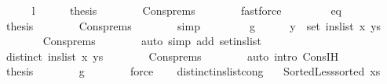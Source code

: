 \begin{isabellebody}
\ \ \ \ \isamarkupfalse%
\ l\isanewline
\ \ \ \ \isamarkupfalse%
\ {\isacharquery}{\kern0pt}thesis\isanewline
\ \ \ \ \ \ \isamarkupfalse%
\ Cons{\isachardot}{\kern0pt}prems\isanewline
\ \ \ \ \ \ \isamarkupfalse%
\ fastforce\isanewline
\ \ \isamarkupfalse%
\isanewline
\ \ \ \ \isamarkupfalse%
\ eq\isanewline
\ \ \ \ \isamarkupfalse%
\ {\isacharquery}{\kern0pt}thesis\isanewline
\ \ \ \ \ \ \isamarkupfalse%
\ Cons{\isachardot}{\kern0pt}prems\isanewline
\ \ \ \ \ \ \isamarkupfalse%
\ simp\isanewline
\ \ \isamarkupfalse%
\isanewline
\ \ \ \ \isamarkupfalse%
\ g\isanewline
\ \ \ \ \isamarkupfalse%
\ {\isachardoublequoteopen}y\ {\isasymnotin}\ set\ {\isacharparenleft}{\kern0pt}ins{\isacharunderscore}{\kern0pt}list\ x\ ys{\isacharparenright}{\kern0pt}{\isachardoublequoteclose}\isanewline
\ \ \ \ \ \ \isamarkupfalse%
\ Cons{\isachardot}{\kern0pt}prems\isanewline
\ \ \ \ \ \ \isamarkupfalse%
\ {\isacharparenleft}{\kern0pt}auto\ simp\ add{\isacharcolon}{\kern0pt}\ set{\isacharunderscore}{\kern0pt}ins{\isacharunderscore}{\kern0pt}list{\isacharparenright}{\kern0pt}\isanewline
\ \ \ \ \isamarkupfalse%
\ \isamarkupfalse%
\ {\isachardoublequoteopen}distinct\ {\isacharparenleft}{\kern0pt}ins{\isacharunderscore}{\kern0pt}list\ x\ ys{\isacharparenright}{\kern0pt}{\isachardoublequoteclose}\isanewline
\ \ \ \ \ \ \isamarkupfalse%
\ Cons{\isachardot}{\kern0pt}prems\isanewline
\ \ \ \ \ \ \isamarkupfalse%
\ {\isacharparenleft}{\kern0pt}auto\ intro{\isacharcolon}{\kern0pt}\ Cons{\isachardot}{\kern0pt}IH{\isacharparenright}{\kern0pt}\isanewline
\ \ \ \ \isamarkupfalse%
\ \isamarkupfalse%
\ {\isacharquery}{\kern0pt}thesis\isanewline
\ \ \ \ \ \ \isamarkupfalse%
\ g\isanewline
\ \ \ \ \ \ \isamarkupfalse%
\ force\isanewline
\ \ \isamarkupfalse%
\isanewline
{}\isamarkupfalse%
%
\endisatagproof
{\isafoldproof}%
%
\isadelimproof
\isanewline
%
\endisadelimproof
%
\isadeliminvisible
\isanewline
%
\endisadeliminvisible
%
\isataginvisible
{}\isamarkupfalse%
\ distinct{\isacharunderscore}{\kern0pt}ins{\isacharunderscore}{\kern0pt}list{\isacharunderscore}{\kern0pt}cong{\isacharcolon}{\kern0pt}\isanewline
\ \ \ {\isachardoublequoteopen}Sorted{\isacharunderscore}{\kern0pt}Less{\isachardot}{\kern0pt}sorted\ xs{\isachardoublequoteclose}\isanewline

\end{isabellebody}
